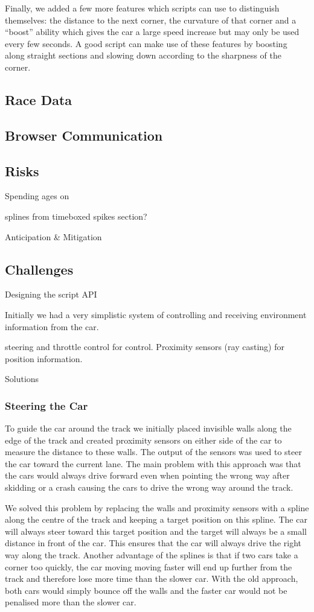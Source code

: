 Finally, we added a few more features which scripts can use to distinguish themselves: the distance to the next corner, the curvature of that corner and a ``boost'' ability which gives the car a large speed increase but may only be used every few seconds. A good script can make use of these features by boosting along straight sections and slowing down according to the sharpness of the corner.

\subsection{Race Data}

\subsection{Browser Communication}

\subsection{Risks}
Spending ages on

splines from timeboxed spikes section?

Anticipation \& Mitigation

\subsection{Challenges}
Designing the script API

Initially we had a very simplistic system of controlling and receiving environment information from the car.

steering and throttle control for control. Proximity sensors (ray casting) for position information.

Solutions

\subsubsection{Steering the Car}
To guide the car around the track we initially placed invisible walls along the edge of the track and created proximity sensors on either side of the car to measure the distance to these walls. The output of the sensors was used to steer the car toward the current lane. The main problem with this approach was that the cars would always drive forward even when pointing the wrong way after skidding or a crash causing the cars to drive the wrong way around the track.

We solved this problem by replacing the walls and proximity sensors with a spline along the centre of the track and keeping a target position on this spline. The car will always steer toward this target position and the target will always be a small distance in front of the car. This ensures that the car will always drive the right way along the track. Another advantage of the splines is that if two cars take a corner too quickly, the car moving moving faster will end up further from the track and therefore lose more time than the slower car. With the old approach, both cars would simply bounce off the walls and the faster car would not be penalised more than the slower car.

